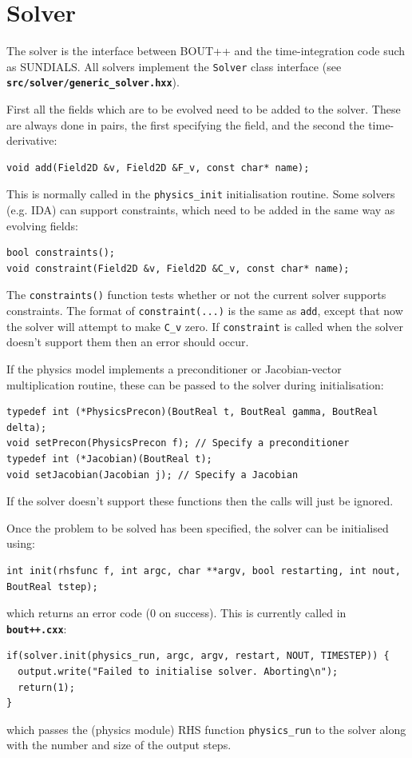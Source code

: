 \documentclass[12pt]{article}
\newcommand{\code}[1]{\texttt{#1}}
\newcommand{\file}[1]{\texttt{\bf #1}}
\begin{document}
\section{Solver}
The solver is the interface between BOUT++ and the time-integration code
such as SUNDIALS. All solvers implement the \code{Solver} class
interface (see \file{src/solver/generic\_solver.hxx}).

First all the fields which are to be evolved need to be added
to the solver. These are always done in pairs, the first
specifying the field, and the second the time-derivative:
\begin{lstlisting}
void add(Field2D &v, Field2D &F_v, const char* name);
\end{lstlisting}
This is normally called in the \code{physics\_init} initialisation routine.
Some solvers (e.g. IDA) can support constraints, which need to be added
in the same way as evolving fields:
\begin{lstlisting}
bool constraints();
void constraint(Field2D &v, Field2D &C_v, const char* name);
\end{lstlisting}
The \code{constraints()} function tests whether or not the current
solver supports constraints. The format of \code{constraint(...)} is
the same as \code{add}, except that now the solver will attempt to make
\code{C\_v} zero. If \code{constraint} is called when the solver doesn't
support them then an error should occur.

If the physics model implements a preconditioner or Jacobian-vector
multiplication routine, these can be passed to the solver during
initialisation:
\begin{lstlisting}
typedef int (*PhysicsPrecon)(BoutReal t, BoutReal gamma, BoutReal delta);
void setPrecon(PhysicsPrecon f); // Specify a preconditioner
typedef int (*Jacobian)(BoutReal t);
void setJacobian(Jacobian j); // Specify a Jacobian
\end{lstlisting}
If the solver doesn't support these functions then the calls 
will just be ignored.

Once the problem to be solved has been specified, the solver can be
initialised using:
\begin{lstlisting}
int init(rhsfunc f, int argc, char **argv, bool restarting, int nout, BoutReal tstep);
\end{lstlisting}
which returns an error code (0 on success). This is currently
called in \file{bout++.cxx}:
\begin{lstlisting}
if(solver.init(physics_run, argc, argv, restart, NOUT, TIMESTEP)) {
  output.write("Failed to initialise solver. Aborting\n");
  return(1);
}
\end{lstlisting}
which passes the (physics module) RHS function \code{physics\_run}
to the solver along with the number and size of the output steps.
\end{document}
